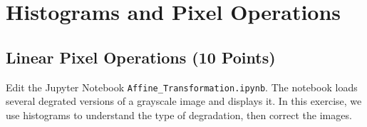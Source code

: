 \def\firstname{Philipp}
\def\lastname{Befeld}
\def\aufgabenblatt{2}




\thispagestyle{page1} 

\section{Histograms and Pixel Operations}

\subsection{Linear Pixel Operations (10 Points)}

Edit the Jupyter Notebook \texttt{Affine\_Transformation.ipynb}. The notebook loads several degrated versions of a grayscale image and displays it.
In this exercise, we use histograms to understand the type of degradation, then correct the images.

